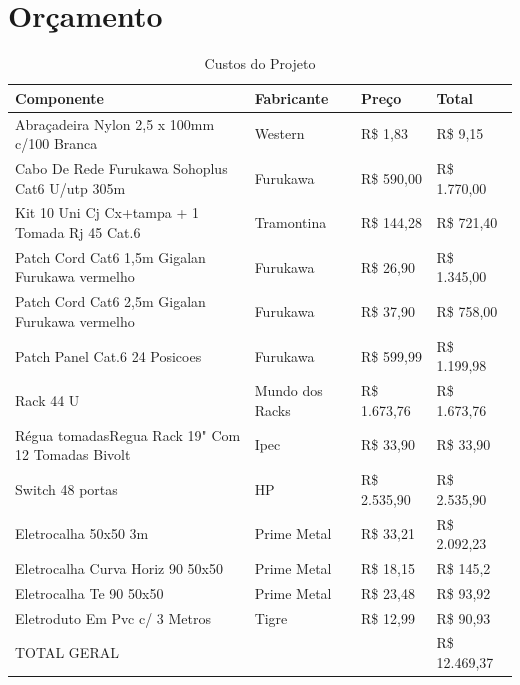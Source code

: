 \documentclass[	DIV=calc,%
paper=a4,%
fontsize=12pt,%
onecolumn]{scrartcl}	 					%
\begin{document}
	\section{Orçamento}
	\begin{table}[h!]\footnotesize
			\centering
		\caption{Custos do Projeto}
		\label{tab3} %
		\renewcommand{\arraystretch}{1.5}
		\begin{tabular}{|l|l|l|l|}
			\hline
			Componente                                        & Fabricante      & Preço        & Total         \\ \hline
			Abraçadeira Nylon 2,5 x 100mm c/100 Branca        & Western         & R\$ 1,83     & R\$ 9,15      \\ \hline
			Cabo De Rede Furukawa Sohoplus Cat6 U/utp 305m    & Furukawa        & R\$ 590,00   & R\$ 1.770,00  \\ \hline
			Kit 10 Uni Cj Cx+tampa + 1 Tomada Rj 45 Cat.6     & Tramontina      & R\$ 144,28   & R\$ 721,40    \\ \hline
			Patch Cord Cat6 1,5m Gigalan Furukawa vermelho    & Furukawa        & R\$ 26,90    & R\$ 1.345,00  \\ \hline
			Patch Cord Cat6 2,5m Gigalan Furukawa vermelho    & Furukawa        & R\$ 37,90    & R\$ 758,00    \\ \hline
			Patch Panel Cat.6 24 Posicoes                     & Furukawa        & R\$ 599,99   & R\$ 1.199,98  \\ \hline
			Rack 44 U                                         & Mundo dos Racks & R\$ 1.673,76 & R\$ 1.673,76  \\ \hline
			Régua tomadasRegua Rack 19" Com 12 Tomadas Bivolt & Ipec            & R\$ 33,90    & R\$ 33,90     \\ \hline
			Switch 48 portas                                  & HP              & R\$ 2.535,90 & R\$ 2.535,90  \\ \hline
			Eletrocalha 50x50 3m                              & Prime Metal     & R\$ 33,21    & R\$ 2.092,23  \\ \hline
			Eletrocalha Curva Horiz 90 50x50                  & Prime Metal     & R\$ 18,15    & R\$ 145,2     \\ \hline
			Eletrocalha Te 90 50x50                           & Prime Metal     & R\$ 23,48    & R\$ 93,92     \\ \hline
			Eletroduto Em Pvc c/ 3 Metros                     & Tigre           & R\$ 12,99    & R\$ 90,93     \\ \hline
			\multicolumn{3}{|l|}{TOTAL GERAL}                                                  & R\$ 12.469,37 \\ \hline
		\end{tabular}
	\end{table}
	
\end{document}
